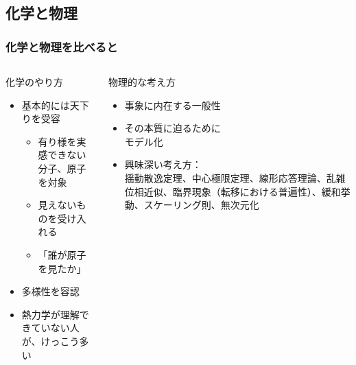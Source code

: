 \documentclass[12pt, dvipdfmx]{beamer}
\begin{document}
\subsection{化学と物理}
\begin{frame}
    \frametitle{化学と物理を比べると}
    \begin{columns}[T, onlytextwidth]
        \begin{block}{化学のやり方}
            \begin{itemize}
                \item 基本的には天下りを受容
                \begin{itemize}
                    \item 有り様を実感できない分子、原子を対象
                    \item 見えないものを受け入れる
                    \item 「誰が原子を見たか」
                \end{itemize}
                \item 多様性を容認
                \item 熱力学が理解できていない人が、けっこう多い
            \end{itemize}
        \end{block}
        
        \begin{exampleblock}{物理的な考え方}
            \begin{itemize}
                \item 事象に内在する一般性
                \item その本質に迫るために\\モデル化
                \item 興味深い考え方：\\
                揺動散逸定理、中心極限定理、線形応答理論、乱雑位相近似、臨界現象（転移における普遍性）、緩和挙動、スケーリング則、無次元化
            \end{itemize}
        \end{exampleblock}
    \end{columns}
\end{frame}
\end{document}
